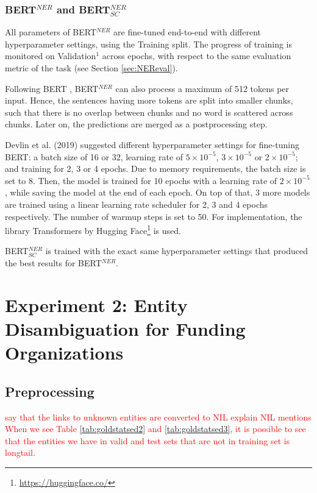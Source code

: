 \documentclass{report}
\theoremstyle{definition}
\theoremstyle{remark}
\begin{document}
\subsubsection{BERT$^{NER}$ and BERT$^{NER}_{SC}$}

All parameters of BERT$^{NER}$ are fine-tuned end-to-end with different hyperparameter settings, using the Training split. The progress of training is monitored on Validation$^1$ across epochs, with respect to the same evaluation metric of the task (see Section \ref{sec:NEReval}).

Following BERT \cite{BERT}, BERT$^{NER}$ can also process a maximum of 512 tokens per input. Hence, the sentences having more tokens are split into smaller chunks, such that there is no overlap between chunks and no word is scattered across chunks. Later on, the predictions are merged as a postprocessing step. 

Devlin et al. (2019) \cite{BERT} suggested different hyperparameter settings for fine-tuning BERT: a batch size of 16 or 32, learning rate of $5\times10^{-5}$, $3\times10^{-5}$ or $2\times10^{-5}$; and training for 2, 3 or 4 epochs. Due to memory requirements, the batch size is set to 8. Then, the model is trained for 10 epochs with a learning rate of $2\times10^{-5}$, while saving the model at the end of each epoch. On top of that, 3 more models are trained using a linear learning rate scheduler for 2, 3 and 4 epochs respectively. The number of warmup steps is set to 50. For implementation, the library Transformers \cite{huggingface} by Hugging Face\footnote{\url{https://huggingface.co/}} is used. 

BERT$^{NER}_{SC}$ is trained with the exact same hyperparameter settings that produced the best results for BERT$^{NER}$. 

\section{Experiment 2: Entity Disambiguation for Funding Organizations}
\label{sec:EDExperiment}

\subsection{Preprocessing}
\textcolor{red}{say that the links to unknown entities are converted to NIL}
\textcolor{red}{explain NIL mentions}
\textcolor{red}{When we see Table \ref{tab:goldstatsed2} and \ref{tab:goldstatsed3}, it is possible to see that the entities we have in valid and test sets that are not in training set is longtail.}
\end{document}
